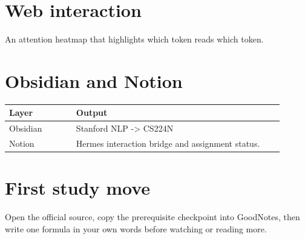 \documentclass[11pt]{article}
\begin{document}
\section*{Web interaction}
An attention heatmap that highlights which token reads which token.

\section*{Obsidian and Notion}
\begin{tabular}{p{0.22\linewidth}p{0.68\linewidth}}
\toprule
Layer & Output \\
\midrule
Obsidian & Stanford NLP -> CS224N \\
Notion & Hermes interaction bridge and assignment status. \\
\bottomrule
\end{tabular}

\section*{First study move}
Open the official source, copy the prerequisite checkpoint into GoodNotes, then write one formula in your own words before watching or reading more.
\end{document}
